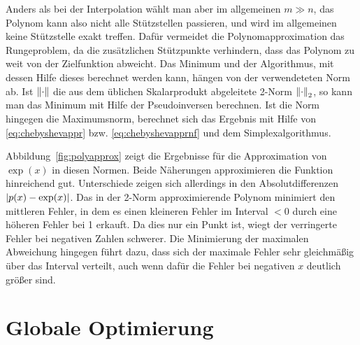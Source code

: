 Anders als bei der Interpolation wählt man aber im allgemeinen $m\gg
n$, das Polynom kann also nicht alle Stützstellen passieren, und wird
im allgemeinen keine Stützstelle exakt treffen. Dafür vermeidet die
Polynomapproximation das Rungeproblem, da die zusätzlichen Stützpunkte
verhindern, dass das Polynom zu weit von der Zielfunktion abweicht.
Das Minimum und der Algorithmus, mit dessen Hilfe dieses berechnet
werden kann, hängen von der verwendeteten Norm ab. Ist $\left\lVert{\cdot}\right\rVert$
die aus dem üblichen Skalarprodukt abgeleitete 2-Norm $\left\lVert{\cdot}\right\rVert_2$,
so kann man das Minimum mit Hilfe der Pseudoinversen berechnen. Ist
die Norm hingegen die Maximumsnorm, berechnet sich das Ergebnis mit
Hilfe von \eqref{eq:chebyshevappr} bzw. \eqref{eq:chebyshevapprnf} und
dem Simplexalgorithmus.

Abbildung~\ref{fig:polyapprox} zeigt die Ergebnisse für die
Approximation von $\exp(x)$ in diesen Normen. Beide Näherungen
approximieren die Funktion hinreichend gut. Unterschiede zeigen sich
allerdings in den Absolutdifferenzen $\left\lvert{p(x) - \exp(x)}\right\rvert$. Das in der
2-Norm approximierende Polynom minimiert den mittleren Fehler, in dem
es einen kleineren Fehler im Interval $<0$ durch eine höheren Fehler
bei 1 erkauft. Da dies nur ein Punkt ist, wiegt der verringerte Fehler
bei negativen Zahlen schwerer. Die Minimierung der maximalen
Abweichung hingegen führt dazu, dass sich der maximale Fehler sehr
gleichmäßig über das Interval verteilt, auch wenn dafür die Fehler bei
negativen $x$ deutlich größer sind.

\afterpage{\raggedbottom
   \clearpage }


\section{Globale Optimierung}

